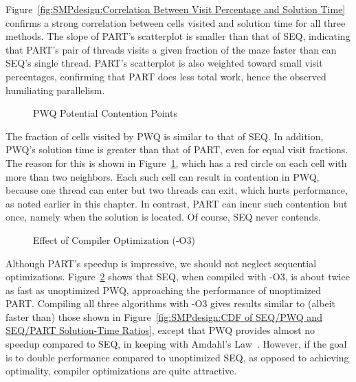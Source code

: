 Figure~\ref{fig:SMPdesign:Correlation Between Visit Percentage and Solution Time}
confirms a strong correlation between cells visited and solution time
for all three methods.
The slope of PART's scatterplot is smaller than that of SEQ,
indicating that PART's pair of threads visits a given fraction
of the maze faster than can SEQ's single thread.
PART's scatterplot is also weighted toward small visit
percentages, confirming that PART does less total work, hence
the observed humiliating parallelism.

\begin{figure}[tb]
\centering
{}
\caption{PWQ Potential Contention Points}
\label{fig:SMPdesign:PWQ Potential Contention Points}
\end{figure}

The fraction of cells visited by PWQ is similar to that of SEQ.
In addition, PWQ's solution time is greater than that of PART,
even for equal visit fractions.
The reason for this is shown in
Figure~\ref{fig:SMPdesign:PWQ Potential Contention Points}, which has a red
circle on each cell with more than two neighbors.
Each such cell can result in contention in PWQ, because
one thread can enter but two threads can exit, which hurts
performance, as noted earlier in this chapter.
In contrast, PART can incur such contention but once, namely
when the solution is located.
Of course, SEQ never contends.

\begin{figure}[tb]
\centering
{}
\caption{Effect of Compiler Optimization (-O3)}
\label{fig:SMPdesign:Effect of Compiler Optimization (-O3)}
\end{figure}

Although PART's speedup is impressive, we should not neglect sequential
optimizations.
Figure~\ref{fig:SMPdesign:Effect of Compiler Optimization (-O3)} shows that
SEQ, when compiled with -O3, is about twice as fast
as unoptimized PWQ, approaching the performance of unoptimized PART.
Compiling all three algorithms with -O3 gives results similar to
(albeit faster than) those shown in
Figure~\ref{fig:SMPdesign:CDF of SEQ/PWQ and SEQ/PART Solution-Time Ratios},
except that PWQ provides almost no speedup compared
to SEQ, in keeping with Amdahl's Law~\cite{GeneAmdahl1967AmdahlsLaw}.
However, if the goal is to double performance compared to unoptimized
SEQ, as opposed to achieving optimality, compiler
optimizations are quite attractive.

